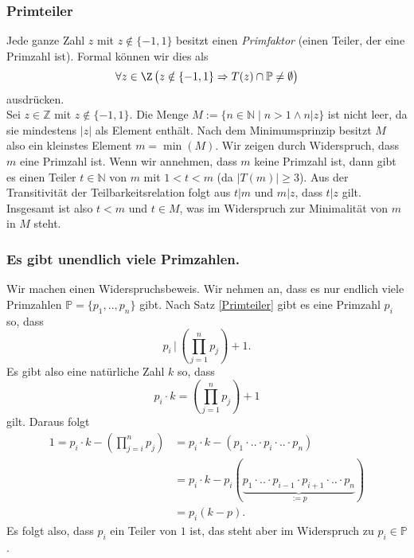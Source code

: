 \subsubsection{Primteiler}
Jede ganze Zahl $z$ mit $z\notin\{-1,1\}$ besitzt einen \textit{Primfaktor} (einen Teiler, der eine Primzahl ist). Formal können wir dies als
\[
\forall z\in\Z\,\big(z\notin\{-1,1\}\Rightarrow T(z)\cap\mathbb{P}\neq\emptyset\big)
\]
ausdrücken. \\
 Sei $z\in\mathbb{Z}$ mit $z\notin\{-1,1\}$. Die Menge $M:=\{n\in\mathbb{N}\mid n>1\wedge n|z\}$ ist nicht leer, da sie mindestens $|z|$ als Element enthält. Nach dem Minimumsprinzip besitzt $M$ also ein kleinstes Element $m=\min(M)$. Wir zeigen durch Widerspruch, dass $m$ eine Primzahl ist. Wenn wir annehmen, dass $m$ keine Primzahl ist, dann gibt es einen Teiler $t\in\mathbb{N}$ von $m$ mit $1<t<m$ (da $|T(m)|\geq 3$). Aus der Transitivität der Teilbarkeitsrelation folgt aus $t|m$ und $m|z$, dass $t|z$ gilt. Insgesamt ist also $t<m$ und $t\in M$, was im Widerspruch zur Minimalität von $m$ in $M$ steht.

\subsubsection{ Es gibt unendlich viele Primzahlen.}
Wir machen einen Widerspruchsbeweis. Wir nehmen an, dass es nur endlich viele Primzahlen $\mathbb{P}=\{p_1,..,p_n\}$ gibt. Nach Satz \ref{Primteiler} gibt es eine Primzahl $p_i$ so, dass
 \[
  p_i\,|\,(\prod_{j=1}^np_j)+1.
 \]
Es gibt also eine natürliche Zahl $k$ so, dass
\[
 p_i\cdot k=(\prod_{j=1}^np_j)+1
\]
gilt. Daraus folgt
\begin{align*}
 1=p_i\cdot k-(\prod_{j=i}^np_j)&=p_i\cdot k-(p_1\cdot..\cdot p_i\cdot..\cdot p_n)\\
&=p_i\cdot k-p_i(\underbrace{p_1\cdot..\cdot p_{i-1}\cdot p_{i+1}\cdot..\cdot p_n}_{:=p})\\
&=p_i(k-p).
\end{align*}
Es folgt also, dass $p_i$ ein Teiler von $1$ ist, das steht aber im Widerspruch zu $p_i\in\mathbb{P}$.

